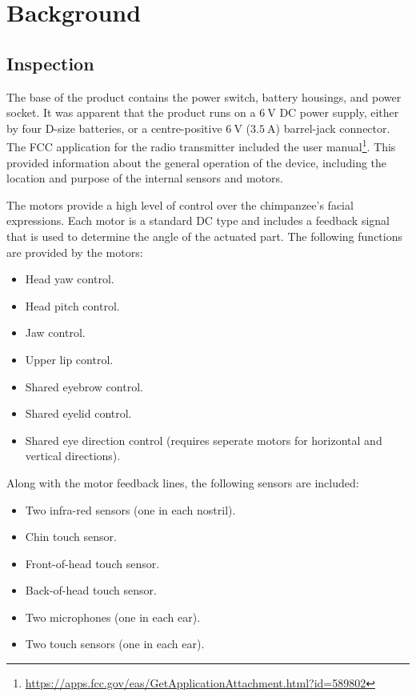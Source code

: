 \documentclass[12pt]{article} %
\begin{document}
\section{Background}

\subsection{Inspection}

The base of the product contains the power switch, battery housings, and power socket.
It was apparent that the product runs on a $\SI{6}{\volt}$ DC power supply, either by four D-size batteries, or a centre-positive $\SI{6}{\volt}$ ($\SI{3.5}{\ampere}$) barrel-jack connector.
The FCC application for the radio transmitter included the user manual\footnote{\url{https://apps.fcc.gov/eas/GetApplicationAttachment.html?id=589802}}.
This provided information about the general operation of the device, including the location and purpose of the internal sensors and motors.

The motors provide a high level of control over the chimpanzee's facial expressions.
Each motor is a standard DC type and includes a feedback signal that is used to determine the angle of the actuated part.
The following functions are provided by the motors:
\begin{itemize}
	\item Head yaw control.
	\item Head pitch control.
	\item Jaw control.
	\item Upper lip control.
	\item Shared eyebrow control.
	\item Shared eyelid control.
	\item Shared eye direction control (requires seperate motors for horizontal and vertical directions).
\end{itemize}

Along with the motor feedback lines, the following sensors are included:
\begin{itemize}
	\item Two infra-red sensors (one in each nostril).
	\item Chin touch sensor.
	\item Front-of-head touch sensor.
	\item Back-of-head touch sensor.
	\item Two microphones (one in each ear).
	\item Two touch sensors (one in each ear).
\end{itemize}
\end{document}

